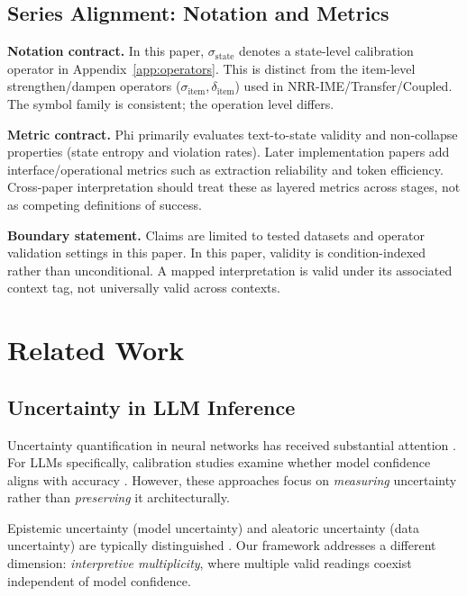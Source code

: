 \documentclass[11pt,a4paper]{article}
\begin{document}
\subsection{Series Alignment: Notation and Metrics}

\textbf{Notation contract.} In this paper, $\sigma_{\mathrm{state}}$ denotes a
state-level calibration operator in Appendix~\ref{app:operators}. This is
distinct from the item-level strengthen/dampen operators
($\sigma_{\text{item}}, \delta_{\text{item}}$) used in NRR-IME/Transfer/Coupled.
The symbol family is consistent; the operation level differs.

\textbf{Metric contract.} Phi primarily evaluates text-to-state validity and
non-collapse properties (state entropy and violation rates). Later
implementation papers add interface/operational metrics such as extraction
reliability and token efficiency. Cross-paper interpretation should treat these
as layered metrics across stages, not as competing definitions of success.

\textbf{Boundary statement.} Claims are limited to tested datasets and operator
validation settings in this paper.
In this paper, validity is condition-indexed rather than unconditional.
A mapped interpretation is valid under its associated context tag, not universally valid across contexts.

\section{Related Work}
\label{sec:related}

\subsection{Uncertainty in LLM Inference}

Uncertainty quantification in neural networks has received substantial attention 
\cite{gal2016dropout, lakshminarayanan2017simple}. For LLMs specifically, calibration 
studies examine whether model confidence aligns with accuracy \cite{kadavath2022language}. 
However, these approaches focus on \textit{measuring} uncertainty rather than 
\textit{preserving} it architecturally.

Epistemic uncertainty (model uncertainty) and aleatoric uncertainty (data uncertainty) 
are typically distinguished \cite{hullermeier2021aleatoric}. Our framework addresses a 
different dimension: \textit{interpretive multiplicity}, where multiple valid readings 
coexist independent of model confidence.
\end{document}
